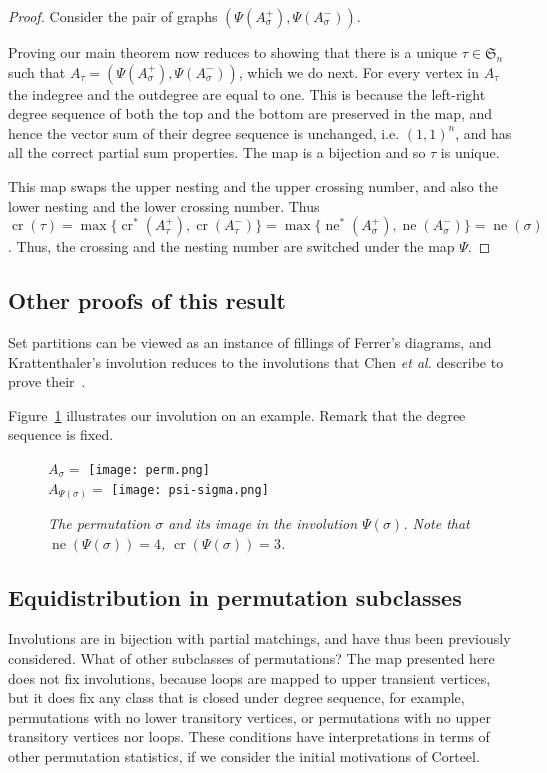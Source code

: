 \documentclass{amsart}
\begin{document}
\begin{proof}
Consider the pair of graphs $(\Psi(A_\sigma^+), \Psi(A_\sigma^{-}))$.

Proving our main theorem now reduces to showing that there is a unique $\tau\in{\mathfrak{S}_n}$ such that $A_\tau=(\Psi(A_\sigma^+), \Psi(A_\sigma^{-}))$, which we do next.
For every vertex in $A_\tau$ the indegree and the outdegree are equal to one. This is because the left-right degree sequence of both the top and the bottom are preserved in the map, and hence the vector sum of their degree sequence is unchanged, i.e. $(1,1)^n$, and has all the correct partial sum properties.  The map is a bijection and so $\tau$ is unique. 

This map swaps the upper nesting and the upper crossing number, and also the lower nesting and the lower crossing number. Thus
${\operatorname{cr}}(\tau)=\max\{{\operatorname{cr}}^*(A_\tau^+),{\operatorname{cr}}(A_\tau^{-})\}=\max \{ {\operatorname{ne}}^*(A_\sigma^+), {\operatorname{ne}}(A_\sigma^{-}) \}={\operatorname{ne}}(\sigma)$. Thus, the crossing and the nesting number are switched under the map $\Psi$.  
\end{proof}

\subsection{Other proofs of this result} Set partitions can be viewed as an instance of fillings of Ferrer's diagrams, and Krattenthaler's involution reduces to the involutions that Chen \emph{ et al.} describe to prove their~\cite[Theorem 1]{Chetal07}.

Figure~\ref{fig:psisigma} illustrates our involution on an example. Remark that the degree sequence is fixed.
\begin{figure}[h!]\center 
\large{$A_\sigma=$} \texttt{[image: perm.png]} \\ \bigskip
\large{$A_{\Psi(\sigma)}=$} \texttt{[image: psi-sigma.png]} \\ \bigskip
\caption{\it The permutation $\sigma$ and its image in the involution $\Psi(\sigma)$. Note that ${\operatorname{ne}}(\Psi(\sigma))=4$, ${\operatorname{cr}}(\Psi(\sigma))=3$.}
\label{fig:psisigma}
\end{figure} 
 
\subsection{Equidistribution in permutation subclasses}
Involutions are in bijection with partial matchings, and have thus been previously considered. What of other subclasses of permutations? The map presented here does not fix involutions, because loops are mapped to upper transient vertices, but it does fix any class that is closed under degree sequence, for example, permutations with no lower transitory vertices, or permutations with no upper transitory vertices nor loops. These conditions have interpretations in terms of other permutation statistics, if we consider the initial motivations of Corteel. 
\end{document}
